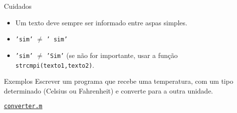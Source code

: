 \documentclass[hyperref={pdfpagelabels=false}]{beamer}
\begin{document}
\begin{frame}{Cuidados}
  \begin{itemize}
  \item Um texto deve sempre ser informado entre aspas simples.
  \item {\texttt{'sim'}} $\ne$ {\texttt{'  sim'}}
  \item {\texttt{'sim'}} $\ne$ {\texttt{'Sim'}} (se não for importante,
		usar a função {\texttt{strcmp\alert{i}(texto1,texto2)}}.
  \end{itemize}
\end{frame}

\begin{frame}{Exemplos}
  Escrever um programa que recebe uma temperatura, com um tipo determinado (Celsius ou Fahrenheit) e converte para a outra unidade.

	\begin{center} \href{listings/converter.m}{\underline{\texttt{converter.m}}} \end{center}
\end{frame}
\end{document}
